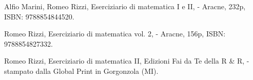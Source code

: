 \begin{etaremune}
\vspace{-3.0mm}
  \item {\sc Alfio Marini, Romeo Rizzi},
   \newblock  Eserciziario di matematica I e II,
    - Aracne, 232p, ISBN: 9788854844520.
\vspace{-3.0mm}
  \item {\sc Romeo Rizzi},
   \newblock  Eserciziario di matematica vol. 2,
    - Aracne, 156p, ISBN: 9788854827332.
\vspace{-3.0mm}
  \item {\sc Romeo Rizzi},
   \newblock  Eserciziario di matematica II,
   \newblock Edizioni Fai da Te della R \& R,
    - stampato dalla Global Print in Gorgonzola (MI).
\end{etaremune}
